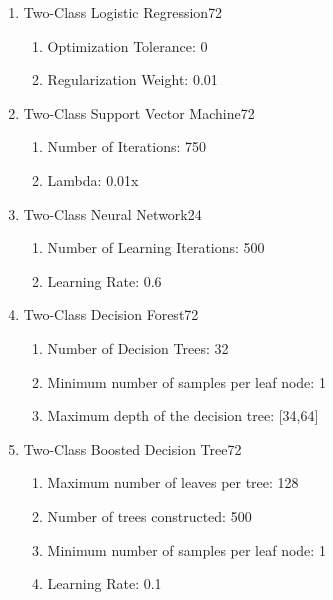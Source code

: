 \begin{enumerate}
    \item{Two-Class Logistic Regression}72
    
    \begin{enumerate}
        \item{Optimization Tolerance:} 0
        \item{Regularization Weight:} 0.01
    \end{enumerate}
    
    \item{Two-Class Support Vector Machine}72
    
    \begin{enumerate}
        \item{Number of Iterations:} 750
        \item{Lambda:} 0.01x
    \end{enumerate}
    
    \item{Two-Class Neural Network}24
    
    \begin{enumerate}
        \item{Number of Learning Iterations:} 500
        \item{Learning Rate:} 0.6
    \end{enumerate}
    
    \item{Two-Class Decision Forest}72

    \begin{enumerate}
        \item{Number of Decision Trees:} 32
        \item{Minimum number of samples per leaf node:} 1
        \item{Maximum depth of the decision tree:} [34,64]
    \end{enumerate}
    
    \item{Two-Class Boosted Decision Tree}72
    
    \begin{enumerate}
        \item{Maximum number of leaves per tree:} 128
        \item{Number of trees constructed:} 500
        \item{Minimum number of samples per leaf node:} 1
        \item{Learning Rate:} 0.1
    \end{enumerate}
    
\end{enumerate}

